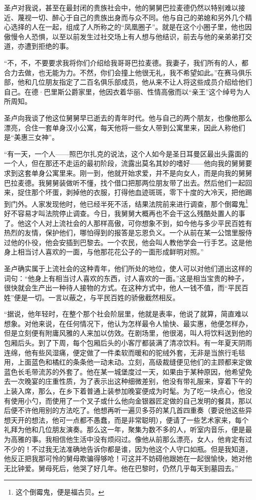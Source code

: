 \par 圣卢对我说，甚至在最封闭的贵族社会中，他的舅舅巴拉麦德仍然以特别难以接近、蔑视一切、醉心于自己的贵族出身而与众不同。他与自己的弟媳和另外几个精心选择的人在一起，组成了人所称之的“凤凰圈子”。就是在这个小圈子里，他也因傲慢令人恐惧，以至以前发生过社交场上有人想与他结识，前去与他的亲弟弟打交道，亦遭到拒绝的事。
\par “不，不，不要要求我将你们介绍给我哥哥巴拉麦德。我妻子，我们所有的人，都合力去做，也无能为力。不然，你们会撞上他很无礼，我不希望如此。”在赛马俱乐部，他和几位朋友指定了二百名俱乐部成员，他从来不让人将这些成员介绍给他们自己。在德·巴里斯公爵家里，他因衣着华丽、性情高傲而以“亲王”这个绰号为人所周知。
\par 圣卢向我谈了他这位舅舅早已逝去的青年时代。他与自己的两个朋友，也像他那么漂亮，合住一套单身汉小公寓，每天他将一些女人带到公寓里来，因此人称他们是“美惠三女神”。
\par “有一天，一个人——照巴尔扎克的说法，这个人如今是圣日耳曼区最出头露面的一个人，但在那还不走运的最初阶段，流露出莫名其妙的嗜好——他向我的舅舅要求到这套单身公寓里来。刚一到，他就开始求爱，并不是向女人，而是向我的舅舅巴拉麦德。我舅舅装做听不懂，找个借口把那两位朋友带了出去。然后他们一起回来，捉住那个坏蛋，剥掉他的衣服，打得他血迹斑斑，零下十度的大冷天，把他踢到门外。人家发现他时，他已经半死不活，结果法院前来进行调查，那个倒霉鬼\footnote{这个倒霉鬼，便是福古贝。}好不容易才叫法院停止调查。今日，我舅舅大概再也不会干这么残酷处置人的事了。他这个人对上流社会的人那样高傲，可你想象不到，如今他与多少平民百姓有热烈的友情，保护他们，哪怕得到的报答是忘恩负义。一个从前在某一公馆里服侍过他的仆役，他会安插到巴黎去。一个农民，他会叫人教他学会一行手艺。这是他身上相当讨人喜欢的一面，与他那花花公子的一面形成鲜明对照。”
\par 圣卢确实属于上流社会的这种青年，他们所处的地位，使人可以对他们道出这样的词句：“他身上有相当讨人喜欢的东西，讨人喜欢的一面。”这是相当宝贵的种子，很快就会生产出一种待人接物的方式。在这种方式中，他人一钱不值，而“平民百姓”便是一切。一言以蔽之，与平民百姓的骄傲截然相反。
\par “据说，他年轻时，在整个那个社会阶层里，他就是表率，他说了就算，简直难以想象。对他来说，在任何情况下，他认为怎样最令人愉快、最实惠，他便怎样办，但是立刻便有附庸风雅的人来加以仿效。在剧场里，他很渴，叫人将饮料送到他的包厢后头。到了下周，每个包厢后头的小客厅都装满了清凉饮料。有一年夏天阴雨连绵，他有些风湿痛，便定做了一件柔软而暖和的驼绒外套，无非是当旅行毛毯用，上面蓝色和橘红的条条他一动未动。立刻，高级裁缝便见他们的主顾都来定做蓝色长毛带流苏的外套了。他在某一城堡度过一天，如果由于某种原因，他希望免去一次晚宴的庄重性质，为了表示出这种细微差别，他没有带礼服来，穿着下午的上装入席，那么，在乡下着普通上装参加晚宴便成为时髦。为了吃一块点心，他没有使用小勺，而使用了一个叉子或什么他向金银器匠定做的自己发明的餐具，那以后便不许他用别的方法吃了。他想再听一遍贝多芬的某几首四重奏（要说他这些异想天开的想法，他可一点都不愚蠢，而是非常聪明），便请了一些艺术家来，每个礼拜为他和几位朋友演奏。那么这一年，聚集为数不多的人，听室内音乐，便是最为高雅的事。我相信他生活中没有烦闷过。像他从前那么漂亮，女人，他肯定有过不少的！不过我无法准确地告诉你都是谁，因为他这个人守口如瓶。但是我知道，他反正把我那可怜的舅母欺骗得够呛！可这并不妨碍他跟她在一起很愉快，她对他无比钟爱。舅母死后，他哭了好几年。他在巴黎时，仍然几乎每天到墓园去。”
